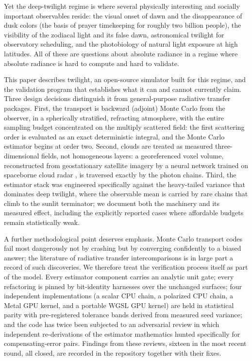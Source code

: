 \documentclass[preprint,12pt]{elsarticle}
\begin{document}
Yet the deep-twilight regime is where several physically interesting and
socially important observables reside: the visual onset of dawn and the
disappearance of dusk colors (the basis of prayer timekeeping for roughly
two billion people), the visibility of the zodiacal light and its false
dawn, astronomical twilight for observatory scheduling, and the
photobiology of natural light exposure at high latitudes. All of these are
questions about absolute radiance in a regime where absolute radiance is
hard to compute and hard to validate.

This paper describes \textsf{twilight}, an open-source simulator built for
this regime, and the validation program that establishes what it can and
cannot currently claim. Three design decisions distinguish it from general-purpose
radiative transfer packages. First, the transport is backward
(adjoint) Monte Carlo from the observer, in a spherically stratified,
refracting atmosphere, with the entire sampling budget concentrated on the
multiply scattered field: the first scattering order is evaluated as an
exact deterministic integral, and the Monte Carlo estimator begins at order
two. Second, clouds are treated as measured three-dimensional fields, not
homogeneous layers: a georeferenced voxel volume, reconstructed from
geostationary satellite imagery by a neural network trained on spaceborne
cloud radar \citep{aybar2025}, is traversed exactly by the photon chains.
Third, the estimator stack was engineered specifically against the
heavy-tailed variance that dominates deep twilight, where the observable
mean is carried by rare chains that climb to the sunlit terminator; we
document both the machinery and its measured effect, including the
explicitly reported cases where affordable budgets remain statistically
weak.

A further methodological point deserves emphasis. Monte Carlo transport
codes fail most dangerously not by crashing but by converging confidently
to a biased answer; the literature of radiative transfer intercomparisons
is in large part a record of such discoveries. We therefore treat the
verification process itself as part of the model. Every estimator
component carries an analytic unit gate; every refactoring is pinned by
bit-identity harnesses over the unchanged surfaces; four independent
implementations (a scalar CPU chain, a polarized CPU chain, a Metal GPU
kernel, and a portable WGSL GPU kernel) are held in statistical parity
with pre-registered tolerance bands derived from measured seed variance;
and the code has twice been subjected to an adversarial review in which
independent re-derivations of the estimator mathematics hunted
specifically for compensating-error pairs. Findings from these reviews,
sixteen in the most recent round, all closed, are recorded in the
repository together with their fixes.
\end{document}
